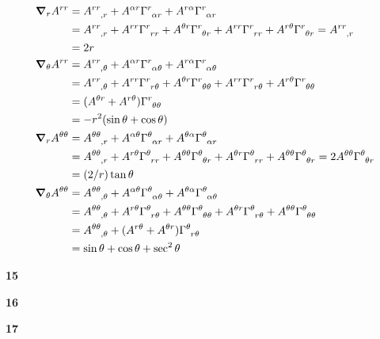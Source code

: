 \message{ !name(gr-ch5-notes.tex)}\documentclass[gr-notes.tex]{subfiles}
\begin{document}
\begin{align*}
  \grad_r A^{rr} &=
  \tensor{A}{^{rr}_{,r}} +
  A^{\alpha r} \tensor{\Gamma}{^r_{\alpha r}} +
  A^{r\alpha} \tensor{\Gamma}{^r_{\alpha r}}
  \\ &=
  \tensor{A}{^{rr}_{,r}} +
  A^{r r} \tensor{\Gamma}{^r_{r r}} +
  A^{\theta r} \tensor{\Gamma}{^r_{\theta r}} +
  A^{r r} \tensor{\Gamma}{^r_{r r}} +
  A^{r \theta} \tensor{\Gamma}{^r_{\theta r}} =
  \tensor{A}{^{rr}_{,r}}
  \\ &=
  2 r
  \\
  \grad_\theta A^{r r} &=
  \tensor{A}{^{r r}_{,\theta}} +
  A^{\alpha r} \tensor{\Gamma}{^r_{\alpha \theta}} +
  A^{r \alpha} \tensor{\Gamma}{^r_{\alpha \theta}}
  \\ &=
  \tensor{A}{^{r r}_{,\theta}} +
  A^{r r} \tensor{\Gamma}{^r_{r \theta}} +
  A^{\theta r} \tensor{\Gamma}{^r_{\theta \theta}} +
  A^{r r} \tensor{\Gamma}{^r_{r \theta}} +
  A^{r \theta} \tensor{\Gamma}{^r_{\theta \theta}}
  \\ &=
  (A^{\theta r} + A^{r \theta}) \tensor{\Gamma}{^r_{\theta \theta}}
  \\ &=
  -r^2 (\sin\theta + \cos\theta)
  \\
  \grad_r A^{\theta \theta} &=
  \tensor{A}{^{\theta \theta}_{,r}} +
  A^{\alpha \theta} \tensor{\Gamma}{^\theta_{\alpha r}} +
  A^{\theta \alpha} \tensor{\Gamma}{^\theta_{\alpha r}}
  \\ &=
  \tensor{A}{^{\theta \theta}_{,r}} +
  A^{r \theta} \tensor{\Gamma}{^\theta_{r r}} +
  A^{\theta \theta} \tensor{\Gamma}{^\theta_{\theta r}} +
  A^{\theta r} \tensor{\Gamma}{^\theta_{r r}} +
  A^{\theta \theta} \tensor{\Gamma}{^\theta_{\theta r}} =
  2 A^{\theta \theta} \tensor{\Gamma}{^\theta_{\theta r}}
  \\ &=
  (2/r) \tan\theta
  \\
  \grad_\theta A^{\theta \theta} &=
  \tensor{A}{^{\theta \theta}_{,\theta}} +
  A^{\alpha \theta} \tensor{\Gamma}{^\theta_{\alpha \theta}} +
  A^{\theta \alpha} \tensor{\Gamma}{^\theta_{\alpha \theta}}
  \\ &=
  \tensor{A}{^{\theta \theta}_{,\theta}} +
  A^{r \theta} \tensor{\Gamma}{^\theta_{r \theta}} +
  A^{\theta \theta} \tensor{\Gamma}{^\theta_{\theta \theta}} +
  A^{\theta r} \tensor{\Gamma}{^\theta_{r \theta}} +
  A^{\theta \theta} \tensor{\Gamma}{^\theta_{\theta \theta}}
  \\ &=
  \tensor{A}{^{\theta \theta}_{,\theta}} +
  (A^{r \theta} + A^{\theta r}) \tensor{\Gamma}{^\theta_{r \theta}}
  \\ &=
  \sin\theta + \cos\theta + \sec^2\theta
\end{align*}




\textbf{15}

\textbf{16}

\textbf{17}
\end{document}

